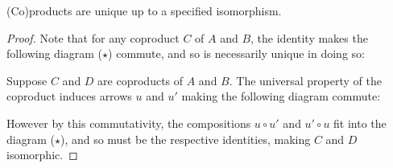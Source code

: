 \documentclass[./thesis.tex]{subfiles}
\begin{document}
\begin{lemma}
	(Co)products are unique up to a specified isomorphism.
\end{lemma}
\begin{proof}
  Note that for any coproduct $C$ of $A$ and $B$, the identity makes the
  following diagram ($⋆$) commute, and so is necessarily unique in doing so:
  \begin{center}
  \end{center}
	Suppose $C$ and $D$ are coproducts of $A$ and $B$. The universal
  property of the coproduct induces arrows $u$ and $u'$ making the following
  diagram commute:
  \begin{center}
  \end{center}
  However by this commutativity, the compositions $u∘u'$ and $u'∘u$ fit into the
  diagram ($⋆$), and so must be the respective identities, making $C$ and $D$
  isomorphic.
\end{proof}
\end{document}
